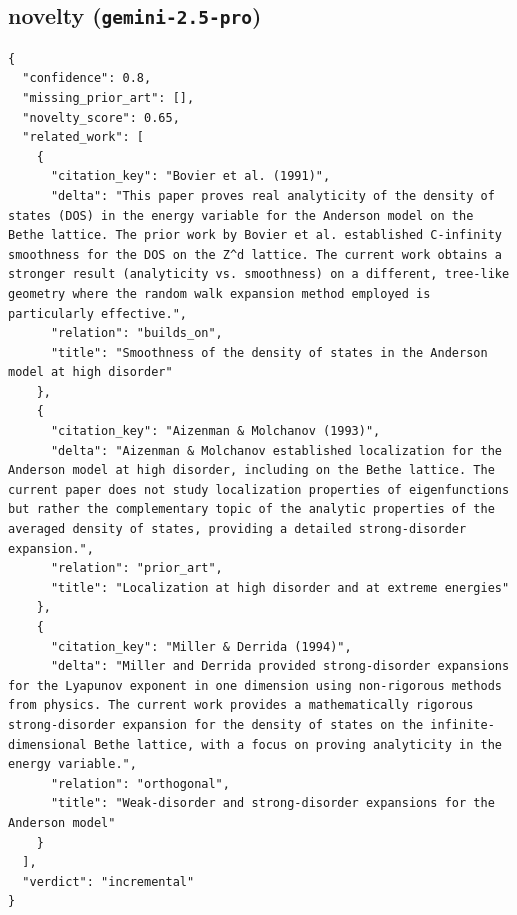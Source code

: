 \documentclass[11pt]{article}
\begin{document}
\subsection*{novelty (\texttt{gemini-2.5-pro})}
\begin{verbatim}
{
  "confidence": 0.8,
  "missing_prior_art": [],
  "novelty_score": 0.65,
  "related_work": [
    {
      "citation_key": "Bovier et al. (1991)",
      "delta": "This paper proves real analyticity of the density of states (DOS) in the energy variable for the Anderson model on the Bethe lattice. The prior work by Bovier et al. established C-infinity smoothness for the DOS on the Z^d lattice. The current work obtains a stronger result (analyticity vs. smoothness) on a different, tree-like geometry where the random walk expansion method employed is particularly effective.",
      "relation": "builds_on",
      "title": "Smoothness of the density of states in the Anderson model at high disorder"
    },
    {
      "citation_key": "Aizenman & Molchanov (1993)",
      "delta": "Aizenman & Molchanov established localization for the Anderson model at high disorder, including on the Bethe lattice. The current paper does not study localization properties of eigenfunctions but rather the complementary topic of the analytic properties of the averaged density of states, providing a detailed strong-disorder expansion.",
      "relation": "prior_art",
      "title": "Localization at high disorder and at extreme energies"
    },
    {
      "citation_key": "Miller & Derrida (1994)",
      "delta": "Miller and Derrida provided strong-disorder expansions for the Lyapunov exponent in one dimension using non-rigorous methods from physics. The current work provides a mathematically rigorous strong-disorder expansion for the density of states on the infinite-dimensional Bethe lattice, with a focus on proving analyticity in the energy variable.",
      "relation": "orthogonal",
      "title": "Weak-disorder and strong-disorder expansions for the Anderson model"
    }
  ],
  "verdict": "incremental"
}
\end{verbatim}
\end{document}
